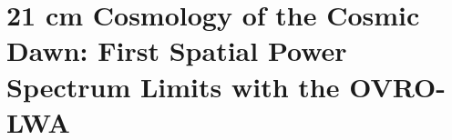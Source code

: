 \chapter{21 cm Cosmology of the Cosmic Dawn: First Spatial Power Spectrum Limits with the OVRO-LWA}


